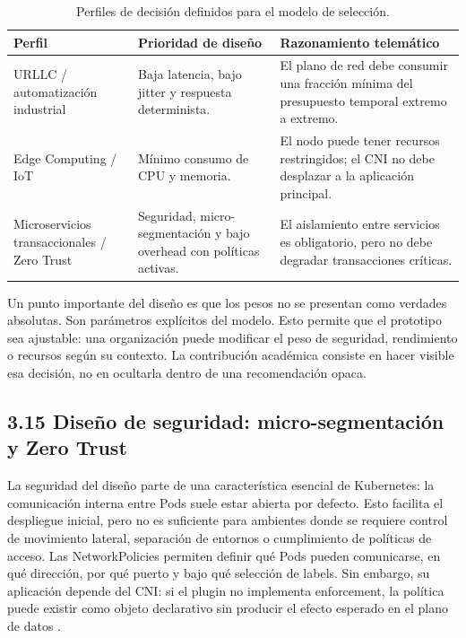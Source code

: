 \documentclass[journal]{IEEEtran}
\begin{document}
\begin{table}[htbp]
\centering
\scriptsize
\caption{Perfiles de decisión definidos para el modelo de selección.}
\label{tab:perfiles-decision}
\begin{tabularx}{\textwidth}{|Y|Y|Y|}
\hline
\textbf{Perfil} & \textbf{Prioridad de diseño} & \textbf{Razonamiento telemático} \\
\hline
URLLC / automatización industrial & Baja latencia, bajo jitter y respuesta determinista. & El plano de red debe consumir una fracción mínima del presupuesto temporal extremo a extremo. \\
\hline
Edge Computing / IoT & Mínimo consumo de CPU y memoria. & El nodo puede tener recursos restringidos; el CNI no debe desplazar a la aplicación principal. \\
\hline
Microservicios transaccionales / Zero Trust & Seguridad, micro-segmentación y bajo overhead con políticas activas. & El aislamiento entre servicios es obligatorio, pero no debe degradar transacciones críticas. \\
\hline
\end{tabularx}
\end{table}

Un punto importante del diseño es que los pesos no se presentan como verdades absolutas. Son parámetros explícitos del modelo. Esto permite que el prototipo sea ajustable: una organización puede modificar el peso de seguridad, rendimiento o recursos según su contexto. La contribución académica consiste en hacer visible esa decisión, no en ocultarla dentro de una recomendación opaca.

\subsection{3.15 Diseño de seguridad: micro-segmentación y Zero Trust}

La seguridad del diseño parte de una característica esencial de Kubernetes: la comunicación interna entre Pods suele estar abierta por defecto. Esto facilita el despliegue inicial, pero no es suficiente para ambientes donde se requiere control de movimiento lateral, separación de entornos o cumplimiento de políticas de acceso. Las NetworkPolicies permiten definir qué Pods pueden comunicarse, en qué dirección, por qué puerto y bajo qué selección de labels. Sin embargo, su aplicación depende del CNI: si el plugin no implementa enforcement, la política puede existir como objeto declarativo sin producir el efecto esperado en el plano de datos \cite{ref4,ref18}.
\end{document}
